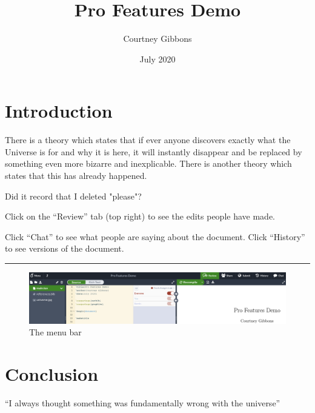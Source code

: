 \documentclass{article}
\title{Pro Features Demo}
\author{Courtney Gibbons}
\date{July 2020}
\begin{document}
\maketitle

\section{Introduction}
There is a theory which states that if ever anyone discovers exactly what the Universe is for and why it is here, it will instantly disappear and be replaced by something even more bizarre and inexplicable.
There is another theory which states that this has already happened.


Did it record that I deleted "please"?


\bigskip

Click on the ``Review'' tab (top right) to see the edits people have made.

Click ``Chat'' to see what people are saying about the document.  Click ``History'' to see versions of the document.


\bigskip

\hrule


\begin{figure}[h!]
\centering
\includegraphics[width=.9 \textwidth]{Screenshot 2020-07-27 12.16.31.png}
\caption{The menu bar}
\label{fig:universe}
\end{figure}

\section{Conclusion}
``I always thought something was fundamentally wrong with the universe'' \citep{adams1995hitchhiker}



\end{document}
